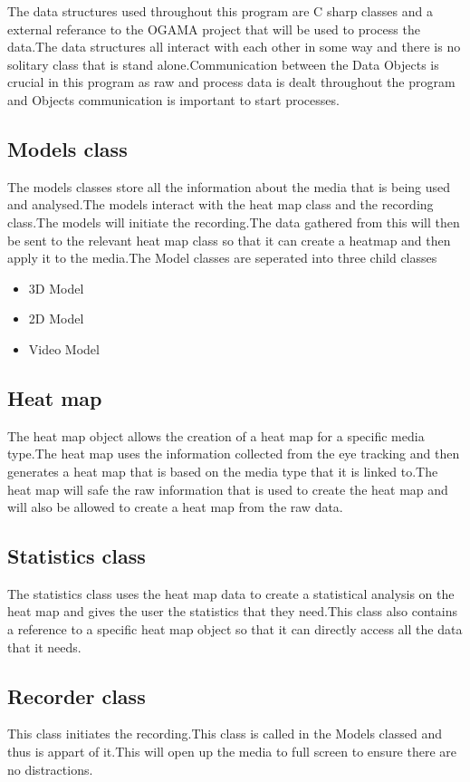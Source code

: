 The data structures used throughout this program are C sharp classes and a external referance to the OGAMA project that will be used to process the data.The data structures all interact with each other in some way and there is no solitary class that is stand alone.Communication between the Data Objects is crucial in this program as raw and process data is dealt throughout the program and Objects communication is important to start processes.

\subsection{Models class}
The models classes store all the information about the media that is being used and analysed.The models interact with the heat map class and the recording class.The models will initiate the recording.The data gathered from this will then be sent to the relevant heat map class so that it can create a heatmap and then apply it to the media.The Model classes are seperated into three child classes
\begin{itemize}
\item 3D Model
\item 2D Model
\item Video Model
\end{itemize}
\subsection{Heat map}
The heat map object allows the creation of a heat map for a specific media type.The heat map uses the information collected from the eye tracking and then generates a heat map that is based on the media type that it is linked to.The heat map will safe the raw information that is used to create the heat map and will also be allowed to create a heat map from the raw data.
\subsection{Statistics class}
The statistics class uses the heat map data to create a statistical analysis on the heat map and gives the user the statistics that they need.This class also contains a reference to a specific heat map object so that it can directly access all the data that it needs.
\subsection{Recorder class}
This class initiates the recording.This class is called in the Models classed and thus is appart of it.This will open up the media to full screen to ensure there are no distractions.
